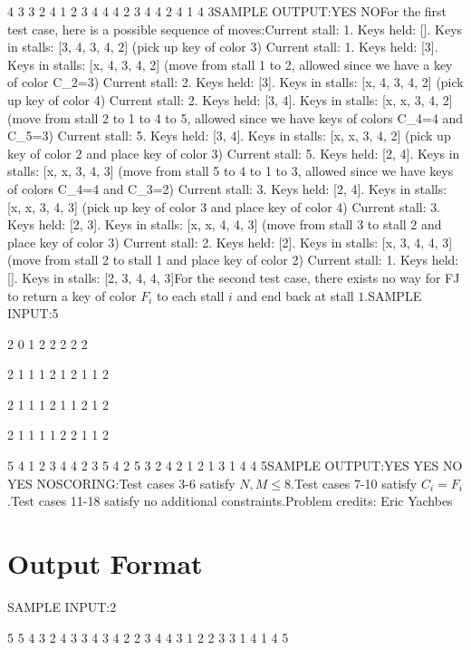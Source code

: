 \documentclass[12pt]{article}
\begin{document}
4 3
3 2 4 1
2 3 4 4
4 2 3 4
4 2
4 1
4 3SAMPLE OUTPUT:YES
NOFor the first test case, here is a possible sequence of moves:Current stall: 1. Keys held: []. Keys in stalls: [3, 4, 3, 4, 2]
(pick up key of color 3)
Current stall: 1. Keys held: [3]. Keys in stalls: [x, 4, 3, 4, 2]
(move from stall 1 to 2, allowed since we have a key of color C_2=3)
Current stall: 2. Keys held: [3]. Keys in stalls: [x, 4, 3, 4, 2]
(pick up key of color 4)
Current stall: 2. Keys held: [3, 4]. Keys in stalls: [x, x, 3, 4, 2]
(move from stall 2 to 1 to 4 to 5, allowed since we have keys of colors C_4=4 and C_5=3)
Current stall: 5. Keys held: [3, 4]. Keys in stalls: [x, x, 3, 4, 2]
(pick up key of color 2 and place key of color 3)
Current stall: 5. Keys held: [2, 4]. Keys in stalls: [x, x, 3, 4, 3]
(move from stall 5 to 4 to 1 to 3, allowed since we have keys of colors C_4=4 and C_3=2)
Current stall: 3. Keys held: [2, 4]. Keys in stalls: [x, x, 3, 4, 3]
(pick up key of color 3 and place key of color 4)
Current stall: 3. Keys held: [2, 3]. Keys in stalls: [x, x, 4, 4, 3]
(move from stall 3 to stall 2 and place key of color 3)
Current stall: 2. Keys held: [2]. Keys in stalls: [x, 3, 4, 4, 3]
(move from stall 2 to stall 1 and place key of color 2)
Current stall: 1. Keys held: []. Keys in stalls: [2, 3, 4, 4, 3]For the second test case, there exists no way for FJ to return a key of color
$F_i$ to each stall $i$ and end back at stall $1$.SAMPLE INPUT:5

2 0
1 2
2 2
2 2

2 1
1 1
2 1
2 1
1 2

2 1
1 1
2 1
1 2
1 2

2 1
1 1
1 2
2 1
1 2

5 4
1 2 3 4 4
2 3 5 4 2
5 3 2 4 2
1 2
1 3
1 4
4 5SAMPLE OUTPUT:YES
YES
NO
YES
NOSCORING:Test cases 3-6 satisfy $N,M\le 8$.Test cases 7-10 satisfy $C_i=F_i$.Test cases 11-18 satisfy no additional constraints.Problem credits: Eric Yachbes

\section*{Output Format}
SAMPLE INPUT:2

5 5
4 3 2 4 3
3 4 3 4 2
2 3 4 4 3
1 2
2 3
3 1
4 1
4 5
\end{document}
